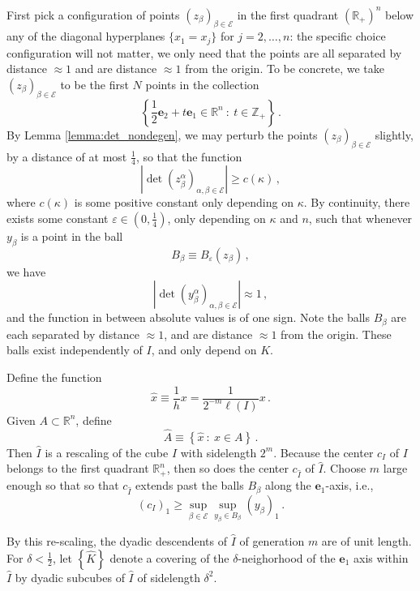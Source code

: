 \documentclass{amsart}%
\renewcommand{\hat}{\widehat}
\renewcommand{\epsilon}{\varepsilon}
\theoremstyle{plain}
\numberwithin{equation}{section}
\begin{document}
First pick a configuration of points $(z_{\beta})_{\beta \in \mathcal{E}}$ in the first quadrant $\left ( \mathbb{R}_{+} \right )^n$ below any of the diagonal hyperplanes $\{ x_1 = x_j\}$ for $j=2, \ldots , n$: the specific choice configuration will not matter, we only need that the points are all separated by distance $\approx 1$ and are distance $\approx 1$ from the origin. To be concrete, we take $(z_{\beta})_{\beta \in \mathcal{E}}$ to be the first $N$ points in the collection 
\[
	\left \{ \frac{1}{2} \mathbf{e}_2 + t \mathbf{e}_1 \in \mathbb{R}^n  ~:~ t\in \mathbb{Z}_{+} \right \} \, . 
\]
 By Lemma \ref{lemma:det_nondegen}, we may perturb the points $(z_{\beta})_{\beta \in \mathcal{E}}$ slightly, by a distance of at most $\frac{1}{4}$, so that the function
\[
	\left | \det (z_{\beta}^{\alpha} )_{\alpha, \beta \in \mathcal{E}} \right |  \geq c(\kappa) \, ,
\]
where $c(\kappa)$ is some positive constant only depending on $\kappa$.
By continuity, there exists some constant $\epsilon \in (0, \frac{1}{4} )$, only depending on $\kappa$ and $n$, such that whenever $y_{\beta}$ is a point in the ball 
\[
 B_{\beta} \equiv B_{\epsilon } ( z_{\beta}) \, ,
\]
we have
\begin{equation}\label{eq:det_nondegen}
\left | \det (y_{\beta}^{\alpha} )_{\alpha, \beta \in \mathcal{E}} \right| \approx 1 \, ,
\end{equation}
and the function in between absolute values is of one sign. Note the balls $B_{\beta}$ are each separated by distance $\approx 1$, and are distance $\approx 1$ from the origin. These balls exist independently of $I$, and only depend on $K$. 


Define the function 
\[
	\hat{x} \equiv \frac{1}{h} x = \frac{1}{2^{-m} \ell \left ( I \right )} x  \, .
\]
Given $A \subset \mathbb{R}^n$, define 
\[
	\hat{A} \equiv \left \{ \hat{x} ~:~ x \in A \right \} \, . 
\]
Then $\hat{I}$ is a rescaling of the cube $I$ with sidelength $2^{m}$. Because the center $c_I$ of $I$ belongs to the first quadrant $\mathbb{R}_{+} ^n$, then so does the center $c_{\hat{I}}$ of $\hat{I}$. Choose $m$ large enough so that so that $c_{\hat{I}}$ extends past the balls $B_{\beta}$ along the $\mathbf{e}_1$-axis, i.e., 
\[
	\left( c_I \right )_1 \geq \sup\limits_{\beta \in \mathcal{E}}\sup\limits_{y_{\beta} \in B_{\beta}} \left (y_{\beta} \right )_{1} \, . 
\]

By this re-scaling, the dyadic descendents of $\hat{I}$ of generation $m$ are of unit length. For $\delta < \frac{1}{2}$, let $\left \{ \hat{K} \right \}$ denote a covering of the $ \delta$-neighorhood of the $\mathbf{e}_1$ axis within $\hat{I}$ by dyadic subcubes of $\hat{I}$ of sidelength $\delta^2$.
\end{document}
